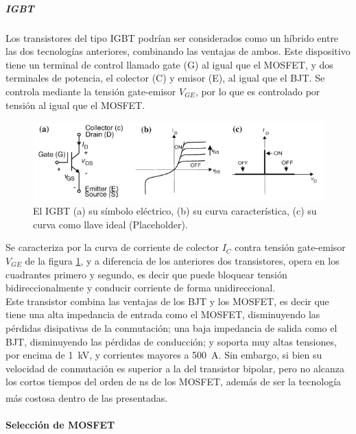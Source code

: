 \subparagraph{IGBT}

Los transistores del tipo IGBT podrían ser considerados como un híbrido entre las dos tecnologías anteriores, combinando las ventajas de ambos. Este dispositivo tiene un terminal de control llamado gate (G) al igual que el MOSFET, y dos terminales de potencia, el colector (C) y emisor (E), al igual que el BJT. Se controla mediante la tensión gate-emisor $V_{GE}$, por lo que es controlado por tensión al igual que el MOSFET.\\

\begin{figure}[h]
    \centering
    \includegraphics[scale=0.6]{Imagenes/IGBT.png}
    \caption{El IGBT (a) su símbolo eléctrico, (b) su curva característica, (c) su curva como llave ideal (Placeholder).}
    \label{igbt}
\end{figure}

Se caracteriza por la curva de corriente de colector $I_C$ contra tensión gate-emisor $V_{GE}$ de la figura \ref{igbt}, y a diferencia de los anteriores dos transistores, opera en los cuadrantes primero y segundo, es decir que puede bloquear tensión bidireccionalmente y conducir corriente de forma unidireccional.\\

Este transistor combina las ventajas de los BJT y los MOSFET, es decir que tiene una alta impedancia de entrada como el MOSFET, disminuyendo las pérdidas disipativas de la conmutación; una baja impedancia de salida como el BJT, disminuyendo las pérdidas de conducción; y soporta muy altas tensiones, por encima de \SI[]{1}[]{\kilo\volt}, y corrientes mayores a \SI[]{500}[]{\ampere}. Sin embargo, si bien su velocidad de conmutación es superior a la del transistor bipolar, pero no alcanza los cortos tiempos del orden de \unit[]{\nano\second} de los MOSFET, además de ser la tecnología más costosa dentro de las presentadas.\textsuperscript{\cite{PotenciaHart}\cite{PowerElecRenewableEnergySystems}}\\

\paragraph{Selección de MOSFET}


